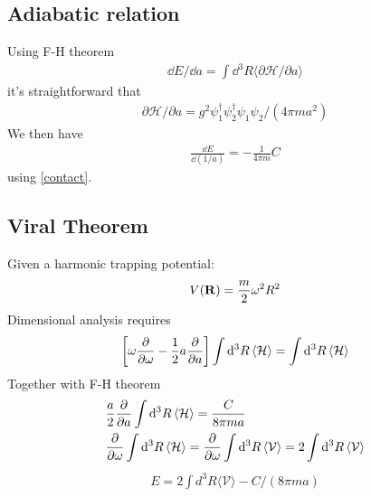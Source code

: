 \documentclass{article}
\begin{document}
\subsection{Adiabatic relation}
Using F-H theorem
\begin{align}
	\dd E / \dd a = \int \dd^{3} R \langle \partial \mathcal{H} / \partial a \rangle
\end{align}
it's straightforward that
\begin{align}
	\partial \mathcal{H} / \partial a = g^{2} \psi_{1}^{\dagger} \psi_{2}^{\dagger} \psi_{1} \psi_{2} / (4 \pi m a^{2})
\end{align}
We then have
\begin{align}
	\frac {\dd E} {\dd (1 / a)} = - \frac {1} {4 \pi m} C
\end{align}
using \eqref{contact}.
\subsection{Viral Theorem}
Given a harmonic trapping potential: 
\begin{align}
	V(\vb{R})=\frac{m}{2}\omega^2R^2
\end{align}
Dimensional analysis requires
\begin{align}
	\bqty{\omega\pdv{\omega}-\frac{1}{2}a\pdv{a}}\int\dd^3R\expval{\mathcal{H}}=\int\dd^3R\expval{\mathcal{H}}
\end{align}
Together with F-H theorem
\begin{align}
	  & \frac{a}{2}\pdv{a}\int\dd^3R\expval{\mathcal{H}}=\frac{C}{8\pi m a} \\
	  & \pdv{\omega}\int\dd^3R\expval{\mathcal{H}}=\pdv{\omega}\int\dd^3R\expval{\mathcal{V}}=2\int\dd^3R\expval{\mathcal{V}}
\end{align}
\begin{align}
	E=2 \int d^{3} R\langle\mathcal{V}\rangle-C /(8 \pi m a)
\end{align}
\end{document}

